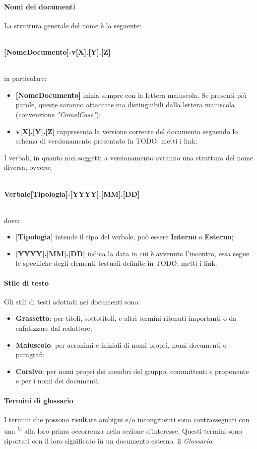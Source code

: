 \paragraph{Nomi dei documenti}
La struttura generale del nome è la seguente: \\ \\
\centerline{\textbf{[NomeDocumento]-v[X].[Y].[Z]}}\\
in particolare:
\begin{itemize}
\item \textbf{[NomeDocumento]} inizia sempre con la lettera maiuscola. Se presenti più parole, queste saranno attaccate ma distinguibili dalla lettera maiuscola (convenzione \textit{"CamelCase"});
\item \textbf{v[X].[Y].[Z]} rappresenta la versione corrente del documento seguendo lo schema di versionamento presentato in TODO: metti i link;
\end{itemize}
I verbali, in quanto non soggetti a versionamento avranno una struttura del nome diversa, ovvero:\\ \\
\centerline{\textbf{Verbale[Tipologia]-[YYYY].[MM].[DD]}} \\
dove:
\begin{itemize}
\item \textbf{[Tipologia]} intende il tipo del verbale, può essere \textbf{Interno} o \textbf{Esterno};
\item \textbf{[YYYY].[MM].[DD]} indica la data in cui è avvenuto l'incontro, essa segue le specifiche degli elementi testuali definite in TODO: metti i link.
\end{itemize}


\paragraph{Stile di testo}
Gli stili di testi adottati nei documenti sono:
\begin{itemize}
\item \textbf{Grassetto}: per titoli, sottotitoli, e altri termini ritenuti importanti o da enfatizzare dal redattore;
\item \textbf{Maiuscolo}: per acronimi e iniziali di nomi propri, nomi documenti e paragrafi;
\item \textbf{Corsivo}: per nomi propri dei membri del gruppo, committenti e proponente e per i nomi dei documenti.
\end{itemize}


\paragraph{Termini di glossario}
I termini che possono risultare ambigui e/o incongruenti sono contrassegnati con una \textsuperscript{G} alla loro prima occorrenza nella sezione d’interesse. Questi termini sono riportati con il loro significato in un documento esterno, il \textit{Glossario}.

